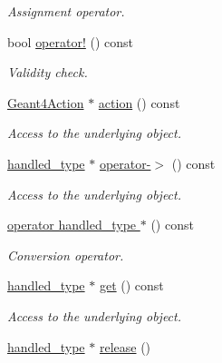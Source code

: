 \begin{DoxyCompactItemize}
\begin{DoxyCompactList}\small\item\em Assignment operator. \end{DoxyCompactList}\item 
bool \hyperlink{class_d_d4hep_1_1_simulation_1_1_geant4_handle_ade2f03e864c95c51ff743dbe10fae34e}{operator!} () const
\begin{DoxyCompactList}\small\item\em Validity check. \end{DoxyCompactList}\item 
\hyperlink{class_d_d4hep_1_1_simulation_1_1_geant4_action}{Geant4\+Action} $\ast$ \hyperlink{class_d_d4hep_1_1_simulation_1_1_geant4_handle_a838155d5c4210bd0878ba77b128e6104}{action} () const
\begin{DoxyCompactList}\small\item\em Access to the underlying object. \end{DoxyCompactList}\item 
\hyperlink{class_d_d4hep_1_1_simulation_1_1_geant4_handle_a35e583b9228e38c95d23112ad19b645d}{handled\+\_\+type} $\ast$ \hyperlink{class_d_d4hep_1_1_simulation_1_1_geant4_handle_a9fad73f7abe0c3389d15fe9d16ddb09f}{operator-\/$>$} () const
\begin{DoxyCompactList}\small\item\em Access to the underlying object. \end{DoxyCompactList}\item 
\hyperlink{class_d_d4hep_1_1_simulation_1_1_geant4_handle_ad8fdc050089c04e746dc5031663afcf8}{operator handled\+\_\+type $\ast$} () const
\begin{DoxyCompactList}\small\item\em Conversion operator. \end{DoxyCompactList}\item 
\hyperlink{class_d_d4hep_1_1_simulation_1_1_geant4_handle_a35e583b9228e38c95d23112ad19b645d}{handled\+\_\+type} $\ast$ \hyperlink{class_d_d4hep_1_1_simulation_1_1_geant4_handle_ae6dc1d1ec5722bff2baf285f241d7dc8}{get} () const
\begin{DoxyCompactList}\small\item\em Access to the underlying object. \end{DoxyCompactList}\item 
\hyperlink{class_d_d4hep_1_1_simulation_1_1_geant4_handle_a35e583b9228e38c95d23112ad19b645d}{handled\+\_\+type} $\ast$ \hyperlink{class_d_d4hep_1_1_simulation_1_1_geant4_handle_a09da8eea7f4d324e8f5dcdc6b53bb861}{release} ()

\end{DoxyCompactItemize}
